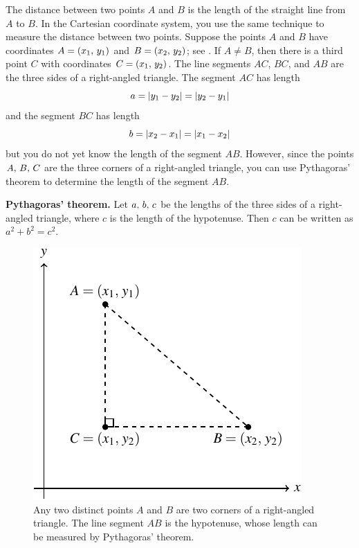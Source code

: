 \documentclass[a4paper,oneside,12pt]{article}
\begin{document}
The distance between two points $A$ and $B$ is the length of the
straight line from $A$ to $B$.  In the Cartesian coordinate system,
you use the same technique to measure the distance between two
points.  Suppose the points $A$ and $B$ have coordinates
$A = \left\lparen{x_1},\, {y_1}\right\rparen$ and $B = \left\lparen{x_2},\, {y_2}\right\rparen$; see
.  If $A \neq B$, then there
is a third point $C$ with coordinates $C = \left\lparen{x_1},\, {y_2}\right\rparen$.  The
line segments $AC$, $BC$, and $AB$ are the three sides of a
right-angled triangle.  The segment $AC$ has length
\[
a
=
\lvert y_1 - y_2\rvert
=
\lvert y_2 - y_1\rvert
\]
and the segment $BC$ has length
\[
b
=
\lvert x_2 - x_1\rvert
=
\lvert x_1 - x_2\rvert
\]
but you do not yet know the length of the segment $AB$.  However,
since the points ${A},\, {B},\, {C}$ are the three corners of a
right-angled triangle, you can use Pythagoras' theorem to determine
the length of the segment $AB$.

\begin{theorem}
\textbf{Pythagoras' theorem.}
Let ${a},\, {b},\, {c}$ be the lengths of the three sides of a
right-angled triangle, where $c$ is the length of the hypotenuse.
Then $c$ can be written as $a^2 + b^2 = c^2$.
\end{theorem}

\begin{figure}[!htbp]
\centering
\includegraphics[scale=1.1]{image/03/distance-two-points.pdf}
\caption{%
  Any two distinct points $A$ and $B$ are two corners of a
  right-angled triangle.  The line segment $AB$ is the hypotenuse,
  whose length can be measured by Pythagoras' theorem.
}
\label{fig:distance_between_two_points}
\end{figure}
\end{document}
